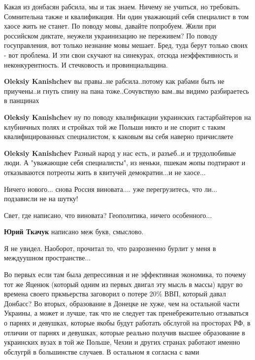 \begin{itemize}

Какая из донбасян рабсила, мы и так знаем. Ничему не учиться, но требовать.
Сомнительна также и квалификация. Ни один уважающий себя специалист в том хаосе
жить не станет. По поводу мовы, давайте попробуем. Жили при российском диктате,
неужели украинизацию не переживем? По поводу госуправления, вот только незнание
мовы мешает. Бред, туда берут только своих - вот проблема. И эти свои скучают
на синекурах, отсюда неэффективность и неконкурентность. И стечковость и
провинциальщина.

\begin{itemize} %
\textbf{Oleksiy Kanishchev} вы правы..не рабсила..потому как рабами быть не приучены..и гнуть спину на пана тоже..Сочувствую вам..вы видимо разбираетесь в панщинах

\textbf{Oleksiy Kanishchev} ну по поводу квалификации украинских гастарбайтеров на клубничных полях и стройках той же Польши никто и не спорит с таким квалифицированных специалистом, к каковым вы себя наверно причисляете

\textbf{Oleksiy Kanishchev} Разный народ у нас есть, и разъеб..и и трудолюбивые люди. А "уважающие себя специалисты", из неньки, пшекам жопы подтирают и отказываются потреоты жить в квитучей демократии...и не хаосе...
\end{itemize} %


Ничего нового... снова Россия виновата.... уже перегрузитесь, что ли...
подзависли не на шутку!

\begin{itemize} %
Свет, где написано, что виновата? Геополитика, ничего особенного...

\textbf{Юрий Ткачук} написано меж букв, смыслово.

Я не увидел. Наоборот, прочитал то, что разрозненно бурлит у меня в междуушном пространстве...
\end{itemize} %


Во первых если там была депрессивная и не эффективная экономика, то почему тот
же Яценюк (который одним из первых двигал эту мысль в массы) вдруг во времена
своего пркмьерства заговорил о потере 20\% ВВП, который давал Донбасс? Во
вторых, образование в Донецке не хуже, чем на остальной части Украины, а может
и лучше, так что не следует так пренебрежительно отзываться о парнях и
девушках, которые якобы будут работать обслугой на просторах РФ, в отличии от
парнях и девушках, которые реально получив высшее образование в украинских
вузах в той же Польше, Чехии и других странах работают именно обслугрй в
большинстве случаев. В остальном я согласна с вами


\end{itemize}
